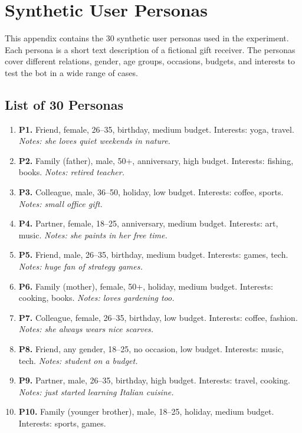 \chapter{Synthetic User Personas}
\label{app:personas}

This appendix contains the 30 synthetic user personas used in the experiment. Each persona is a short text description of a fictional gift receiver. The personas cover different relations, gender, age groups, occasions, budgets, and interests to test the bot in a wide range of cases.

\section{List of 30 Personas}

\begin{enumerate}
    \item \textbf{P1.} Friend, female, 26--35, birthday, medium budget. Interests: yoga, travel. \textit{Notes: she loves quiet weekends in nature.}
    \item \textbf{P2.} Family (father), male, 50+, anniversary, high budget. Interests: fishing, books. \textit{Notes: retired teacher.}
    \item \textbf{P3.} Colleague, male, 36--50, holiday, low budget. Interests: coffee, sports. \textit{Notes: small office gift.}
    \item \textbf{P4.} Partner, female, 18--25, anniversary, medium budget. Interests: art, music. \textit{Notes: she paints in her free time.}
    \item \textbf{P5.} Friend, male, 26--35, birthday, medium budget. Interests: games, tech. \textit{Notes: huge fan of strategy games.}
    \item \textbf{P6.} Family (mother), female, 50+, holiday, medium budget. Interests: cooking, books. \textit{Notes: loves gardening too.}
    \item \textbf{P7.} Colleague, female, 26--35, birthday, low budget. Interests: coffee, fashion. \textit{Notes: she always wears nice scarves.}
    \item \textbf{P8.} Friend, any gender, 18--25, no occasion, low budget. Interests: music, tech. \textit{Notes: student on a budget.}
    \item \textbf{P9.} Partner, male, 26--35, birthday, high budget. Interests: travel, cooking. \textit{Notes: just started learning Italian cuisine.}
    \item \textbf{P10.} Family (younger brother), male, 18--25, holiday, medium budget. Interests: sports, games.

\end{enumerate}
